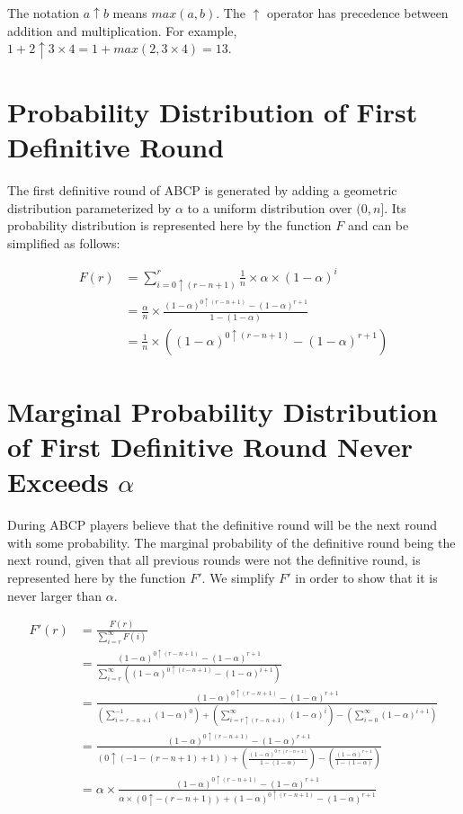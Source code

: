 \documentclass[12pt]{dalcsthesis}
\begin{document}
The notation $a \uparrow b$ means $max(a, b)$. The $\uparrow$ operator has precedence between addition and multiplication. For example, $1 + 2 \uparrow 3 \times 4 = 1 + max(2, 3 \times 4) = 13$.

\section{Probability Distribution of First Definitive Round}
\label{Appendix:ABCP:Probabilities:FirstDefinitiveRound}

The first definitive round of ABCP is generated by adding a geometric distribution parameterized by $\alpha$ to a uniform distribution over $(0, n]$. Its probability distribution is represented here by the function $F$ and can be simplified as follows:

\begin{align*}
F(r)
  &= \sum_{i=0 \uparrow (r-n+1)}^r \frac{1}{n} \times \alpha \times (1-\alpha)^i
\\&= \frac{\alpha}{n} \times \frac{(1-\alpha)^{0 \uparrow (r-n+1)} - (1-\alpha)^{r+1}}{1 - (1-\alpha)}
\\&= \frac{1}{n} \times ((1-\alpha)^{0 \uparrow (r-n+1)} - (1-\alpha)^{r+1})
\end{align*}

\section{Marginal Probability Distribution of First Definitive Round Never Exceeds $\alpha$}
\label{Appendix:ABCP:Probabilities:MarginalFirstDefinitiveRoundBelowAlpha}

During ABCP players believe that the definitive round will be the next round with some probability. The marginal probability of the definitive round being the next round, given that all previous rounds were not the definitive round, is represented here by the function $F'$. We simplify $F'$ in order to show that it is never larger than $\alpha$.

\begin{align*}
F'(r)
  &= \frac{F(r)}{\sum_{i=r}^{\infty} F(i)}
\\&= \frac{(1-\alpha)^{0 \uparrow (r-n+1)} - (1-\alpha)^{r+1}}{\sum_{i=r}^{\infty} ((1-\alpha)^{0 \uparrow (i-n+1)} - (1-\alpha)^{i+1})}
\\&= \frac{(1-\alpha)^{0 \uparrow (r-n+1)} - (1-\alpha)^{r+1}}{(\sum_{i=r-n+1}^{-1} (1-\alpha)^0) + (\sum_{i=r \uparrow (r-n+1)}^{\infty} (1-\alpha)^i) - (\sum_{i=0}^{\infty} (1-\alpha)^{i+1})}
\\&= \frac{(1-\alpha)^{0 \uparrow (r-n+1)} - (1-\alpha)^{r+1}}{(0 \uparrow (-1 - (r-n+1) + 1)) + (\frac{(1-\alpha)^{0 \uparrow (r-n+1)}}{1 - (1-\alpha)}) - (\frac{(1-\alpha)^{r+1}}{1 - (1-\alpha)})}
\\&= \alpha \times \frac{(1-\alpha)^{0 \uparrow (r-n+1)} - (1-\alpha)^{r+1}}{\alpha \times (0 \uparrow -(r-n+1)) + (1-\alpha)^{0 \uparrow (r-n+1)} - (1-\alpha)^{r+1}}
\end{align*}
\end{document}
